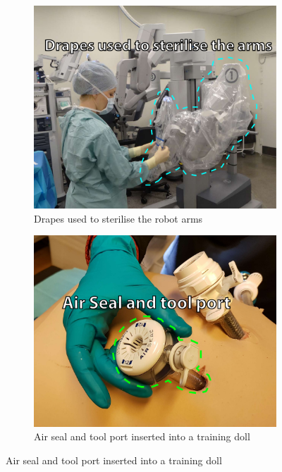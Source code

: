 \documentclass[conference]{IEEEtran}
\begin{document}
\begin{figure}
	\centering
	\begin{subfigure}[b]{0.48\textwidth}
		\includegraphics[width=\textwidth]{Figures/drapes.pdf}
		\caption{Drapes used to sterilise the robot arms}
		\label{fig:drapes}
	\end{subfigure}	
	
	\begin{subfigure}[b]{0.48\textwidth}
		\includegraphics[width=\textwidth]{Figures/port.pdf}
		\caption{Air seal and tool port inserted into a training doll}
		\label{fig:port}
	\end{subfigure}


\end{figure}
\end{document}
